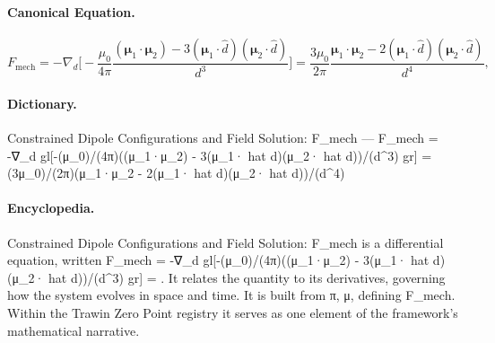 \paragraph{Canonical Equation.}
\[
F_{\mathrm{mech}} = -\nabla_d \biggl[-\frac{\mu_0}{4\pi}\frac{(\boldsymbol{\mu}_1\cdot\boldsymbol{\mu}_2) - 3(\boldsymbol{\mu}_1\cdot \hat d)(\boldsymbol{\mu}_2\cdot \hat d)}{d^3}\biggr] = \frac{3\mu_0}{2\pi}\frac{\boldsymbol{\mu}_1\cdot\boldsymbol{\mu}_2 - 2(\boldsymbol{\mu}_1\cdot \hat d)(\boldsymbol{\mu}_2\cdot \hat d)}{d^4},
\]

\paragraph{Dictionary.}
Constrained Dipole Configurations and Field Solution: F\_mech — F\_mech = -∇\_d gl[-(μ\_0)/(4π)((μ\_1·μ\_2) - 3(μ\_1· hat d)(μ\_2· hat d))/(d\textasciicircum{}3) gr] = (3μ\_0)/(2π)(μ\_1·μ\_2 - 2(μ\_1· hat d)(μ\_2· hat d))/(d\textasciicircum{}4)

\paragraph{Encyclopedia.}
Constrained Dipole Configurations and Field Solution: F\_mech is a differential equation, written F\_mech = -∇\_d gl[-(μ\_0)/(4π)((μ\_1·μ\_2) - 3(μ\_1· hat d)(μ\_2· hat d))/(d\textasciicircum{}3) gr] = . It relates the quantity to its derivatives, governing how the system evolves in space and time. It is built from π, μ, defining F\_mech. Within the Trawin Zero Point registry it serves as one element of the framework's mathematical narrative.

